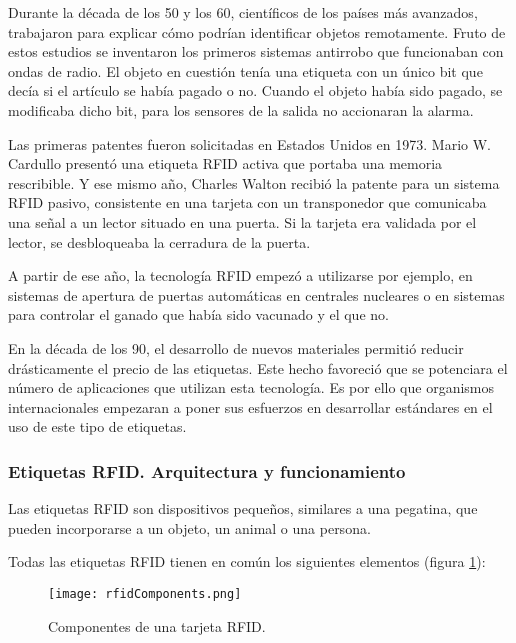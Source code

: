   Durante la década de los 50 y los 60, científicos de los países más
  avanzados, trabajaron para explicar cómo podrían identificar objetos
  remotamente. Fruto de estos estudios se inventaron los primeros sistemas
  antirrobo que funcionaban con ondas de radio. El objeto en cuestión tenía 
  una etiqueta con un único bit que decía si el artículo se había pagado o no.
  Cuando el objeto había sido pagado, se modificaba dicho bit, para los 
  sensores de la salida no accionaran la alarma.

  Las primeras patentes fueron solicitadas en Estados Unidos en 1973. Mario W.
  Cardullo presentó una etiqueta \acs{RFID} activa que portaba una memoria
  rescribible. Y ese mismo año, Charles Walton recibió la patente para un
  sistema \ac{RFID} pasivo, consistente en una tarjeta con un transponedor que
  comunicaba una señal a un lector situado en una puerta. Si la tarjeta era
  validada por el lector, se desbloqueaba la cerradura de la puerta.

  A partir de ese año, la tecnología \acs{RFID} empezó a utilizarse por ejemplo,
  en sistemas de apertura de puertas automáticas en centrales nucleares o en
  sistemas para controlar el ganado que había sido vacunado y el que no.

  En la década de los 90, el desarrollo de nuevos materiales permitió
  reducir drásticamente el precio de las etiquetas. Este hecho favoreció
  que se potenciara el número de aplicaciones que utilizan esta tecnología.
  Es por ello que organismos internacionales empezaran a poner sus esfuerzos en
  desarrollar estándares en el uso de este tipo de etiquetas.

    \subsubsection{Etiquetas \acs{RFID}. Arquitectura y funcionamiento}
  Las etiquetas \acs{RFID} son dispositivos pequeños, similares a una pegatina,
  que pueden incorporarse a un objeto, un animal o una persona. 
  
  Todas las etiquetas \acs{RFID} tienen en común los siguientes elementos
  (figura \ref{fig:rfidComponents}):

  \begin{figure}[!h]
    \begin{center}
      \texttt{[image: rfidComponents.png]}
      \caption{Componentes de una tarjeta \acs{RFID}.}
      \label{fig:rfidComponents}
    \end{center}
  \end{figure}

